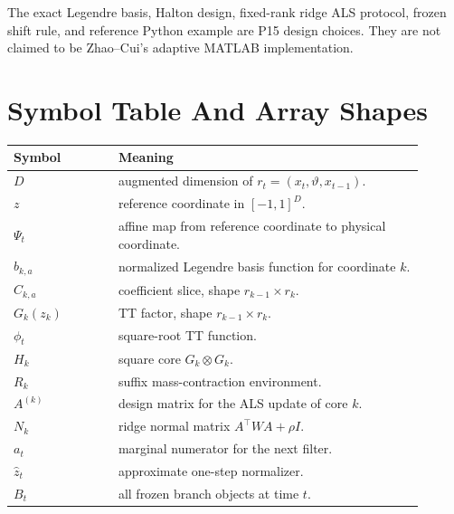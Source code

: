 \documentclass[11pt]{article}
\theoremstyle{definition}
\theoremstyle{remark}
\renewcommand{\[}{\begin{equation}}
\renewcommand{\]}{\end{equation}}
\begin{document}
The exact Legendre basis, Halton design, fixed-rank ridge ALS protocol, frozen
shift rule, and reference Python example are P15 design choices.  They are not
claimed to be Zhao--Cui's adaptive MATLAB implementation.

\section{Symbol Table And Array Shapes}

\begin{longtable}{p{0.23\linewidth}p{0.67\linewidth}}
\toprule
Symbol & Meaning \\
\midrule
\(D\) & augmented dimension of \(r_t=(x_t,\vartheta,x_{t-1})\).\\
\(z\) & reference coordinate in \([-1,1]^D\).\\
\(\Psi_t\) & affine map from reference coordinate to physical coordinate.\\
\(b_{k,a}\) & normalized Legendre basis function for coordinate \(k\).\\
\(C_{k,a}\) & coefficient slice, shape \(r_{k-1}\times r_k\).\\
\(G_k(z_k)\) & TT factor, shape \(r_{k-1}\times r_k\).\\
\(\phi_t\) & square-root TT function.\\
\(H_k\) & square core \(G_k\otimes G_k\).\\
\(R_k\) & suffix mass-contraction environment.\\
\(A^{(k)}\) & design matrix for the ALS update of core \(k\).\\
\(N_k\) & ridge normal matrix \(A^\top W A+\rho I\).\\
\(a_t\) & marginal numerator for the next filter.\\
\(\widehat z_t\) & approximate one-step normalizer.\\
\(B_t\) & all frozen branch objects at time \(t\).\\
\bottomrule
\end{longtable}
\end{document}
